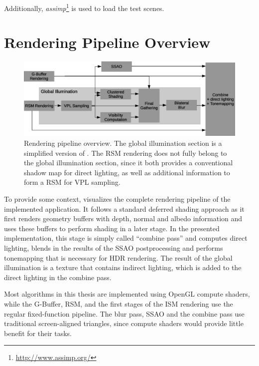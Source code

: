 Additionally, \textit{assimp}\footnote{\url{http://www.assimp.org/}} is used to load the test scenes.


\section{Rendering Pipeline Overview}

\begin{figure}[h]
    \includegraphics[width=\textwidth]{graphics/Rendering_pipeline_rough}
    \caption{Rendering pipeline overview. The global illumination section is a simplified version of . The RSM rendering does not fully belong to the global illumination section, since it both provides a conventional shadow map for direct lighting, as well as additional information to form a RSM for VPL sampling.}
    \label{fig:RenderingPipelineOverview}
\end{figure}


To provide some context,  visualizes the complete rendering pipeline of the implemented application. It follows a standard deferred shading approach as it first renders geometry buffers with depth, normal and albedo information and uses these buffers to perform shading in a later stage. In the presented implementation, this stage is simply called ``combine pass'' and computes direct lighting, blends in the results of the SSAO postprocessing and performs tonemapping that is necessary for HDR rendering. The result of the global illumination is a texture that contains indirect lighting, which is added to the direct lighting in the combine pass.

Most algorithms in this thesis are implemented using OpenGL compute shaders, while the G-Buffer, RSM, and the first stages of the ISM rendering use the regular fixed-function pipeline. The blur pass, SSAO and the combine pass use traditional screen-aligned triangles, since compute shaders would provide little benefit for their tasks.


